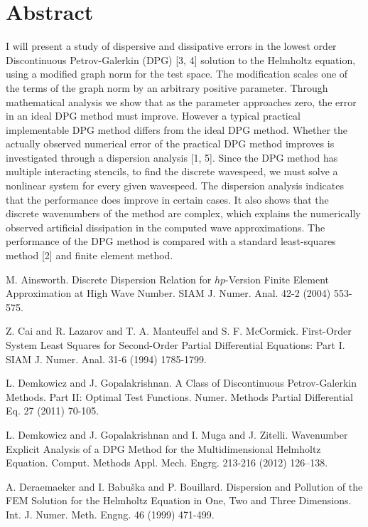 \documentclass[article, A4, 11pt]{llncs}%
\begin{document}
\section*{Abstract}
I will present a study of dispersive and dissipative errors in the lowest order Discontinuous Petrov-Galerkin (DPG) [3, 4] solution to the Helmholtz equation, using a modified graph norm for the test space. The modification scales one of the terms of the graph norm by an arbitrary positive parameter. Through mathematical analysis we show that as the parameter approaches zero, the error in an ideal DPG method must improve. However a typical practical implementable DPG method differs from the ideal DPG method. Whether the actually observed numerical error of the practical DPG method improves is investigated through a dispersion analysis [1, 5]. Since the DPG method has multiple interacting stencils, to find the discrete wavespeed, we must solve a nonlinear system for every given wavespeed. The dispersion analysis indicates that the performance does improve in certain cases. It also shows that the discrete wavenumbers of the method are complex, which explains the numerically observed artificial dissipation in the computed wave approximations. The performance of the DPG method is compared with a standard least-squares method [2] and finite element method.


\begin{thebibliography}{10}
{\sc M. Ainsworth}. {Discrete Dispersion Relation for {$hp$}-Version Finite Element Approximation at High Wave Number}. SIAM J. Numer. Anal. 42-2 (2004) 553-575.

{\sc Z. Cai and R. Lazarov and T. A. Manteuffel and S. F. McCormick}. {First-Order System Least Squares for Second-Order Partial Differential Equations: Part I}. SIAM J. Numer. Anal. 31-6 (1994) 1785-1799.

{\sc L. Demkowicz and J. Gopalakrishnan}. {A Class of Discontinuous Petrov-Galerkin Methods. Part II: Optimal Test Functions}. Numer. Methods Partial Differential Eq. 27 (2011) 70-105.

{\sc L. Demkowicz and J. Gopalakrishnan and I. Muga and J. Zitelli}. {Wavenumber Explicit Analysis of a DPG Method for the Multidimensional Helmholtz Equation}. Comput. Methods Appl. Mech. Engrg. 213-216 (2012) 126–138.

{\sc A. Deraemaeker and I. Babu\v{s}ka and P. Bouillard}. {Dispersion and Pollution of the FEM Solution for the Helmholtz Equation in One, Two and Three Dimensions}. Int. J. Numer. Meth. Engng. 46 (1999) 471-499.
\end{thebibliography} %
\end{document}
